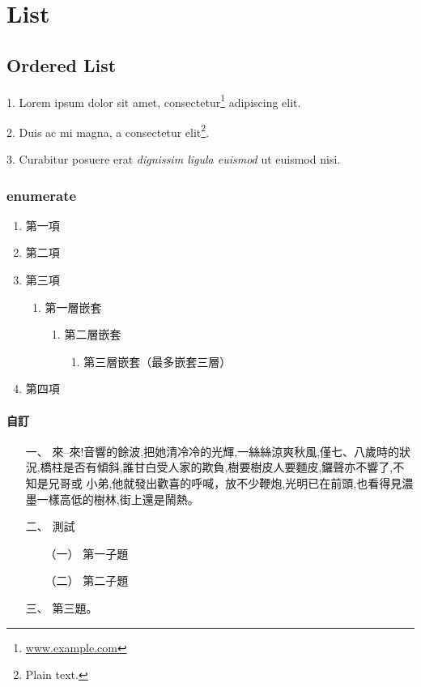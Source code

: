 \chapter{List}

\section{Ordered List}
1. Lorem ipsum dolor sit amet, consectetur\footnote{ \url{www.example.com}} adipiscing elit.

2. Duis ac mi magna, a consectetur elit\footnote{ Plain text.}.

3. Curabitur posuere erat \emph{dignissim ligula euismod} ut euismod nisi.

\subsection{enumerate}
\begin{enumerate}
  \item 第一項
  \item 第二項
  \item 第三項
  \begin{enumerate}
    \item 第一層嵌套
    \begin{enumerate}
      \item 第二層嵌套
      \begin{enumerate}
        \item 第三層嵌套（最多嵌套三層）
      \end{enumerate}
    \end{enumerate}
  \end{enumerate}
  \item 第四項
\end{enumerate}
\subsubsection{自訂}
\begin{enumerate}
\item[一、] 來–來!音響的餘波,把她清冷冷的光輝,一絲絲涼爽秋風,僅七、八歲時的狀
況,橋柱是否有傾斜,誰甘白受人家的欺負,樹要樹皮人要麵皮,鑼聲亦不響了,不知是兄哥或
小弟,他就發出歡喜的呼喊，放不少鞭炮,光明已在前頭,也看得見濃墨一樣高低的樹林,街上還是鬧熱。

\item[二、] 測試
  \begin{enumerate}
    \item[（一）] 第一子題
    \item[（二）] 第二子題
  \end{enumerate}

\item[三、] 第三題。
\end{enumerate}
